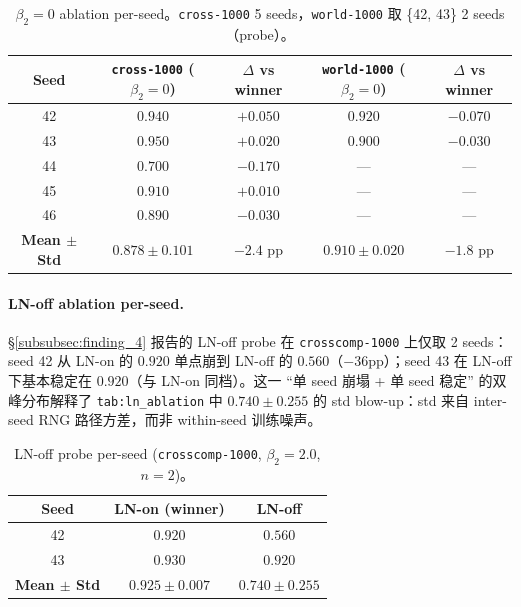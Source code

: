 \begin{table}[h]
\centering
\small
\caption{$\beta_2 = 0$ ablation per-seed。\texttt{cross-1000} 5 seeds，\texttt{world-1000} 取 \{42, 43\} 2 seeds（probe）。}
\label{tab:full_beta2}
\begin{tabular}{ccccc}
\toprule
\textbf{Seed} & \texttt{cross-1000} ($\beta_2\!=\!0$) & $\Delta$ vs winner & \texttt{world-1000} ($\beta_2\!=\!0$) & $\Delta$ vs winner \\
\midrule
42 & $0.940$ & $+0.050$ & $0.920$ & $-0.070$ \\
43 & $0.950$ & $+0.020$ & $0.900$ & $-0.030$ \\
44 & $\mathbf{0.700}$ & $\mathbf{-0.170}$ & — & — \\
45 & $0.910$ & $+0.010$ & — & — \\
46 & $0.890$ & $-0.030$ & — & — \\
\midrule
\textbf{Mean $\pm$ Std} & $0.878 \pm 0.101$ & $-2.4$ pp & $0.910 \pm 0.020$ & $-1.8$ pp \\
\bottomrule
\end{tabular}
\end{table}

\paragraph{LN-off ablation per-seed.}\quad
\S\ref{subsubsec:finding_4} 报告的 LN-off probe 在 \texttt{crosscomp-1000} 上仅取 2 seeds：seed 42 从 LN-on 的 $0.920$ 单点崩到 LN-off 的 $0.560$（$-36$pp）；seed 43 在 LN-off 下基本稳定在 $0.920$（与 LN-on 同档）。这一 ``单 seed 崩塌 + 单 seed 稳定'' 的双峰分布解释了 \texttt{tab:ln\_ablation} 中 $0.740 \pm 0.255$ 的 std blow-up：std 来自 inter-seed RNG 路径方差，而非 within-seed 训练噪声。

\begin{table}[h]
\centering
\small
\caption{LN-off probe per-seed (\texttt{crosscomp-1000}, $\beta_2 = 2.0$, $n=2$)。}
\label{tab:full_ln}
\begin{tabular}{ccc}
\toprule
\textbf{Seed} & \textbf{LN-on (winner)} & \textbf{LN-off} \\
\midrule
42 & $0.920$ & $\mathbf{0.560}$ \\
43 & $0.930$ & $0.920$ \\
\midrule
\textbf{Mean $\pm$ Std} & $0.925 \pm 0.007$ & $0.740 \pm 0.255$ \\
\bottomrule
\end{tabular}
\end{table}

